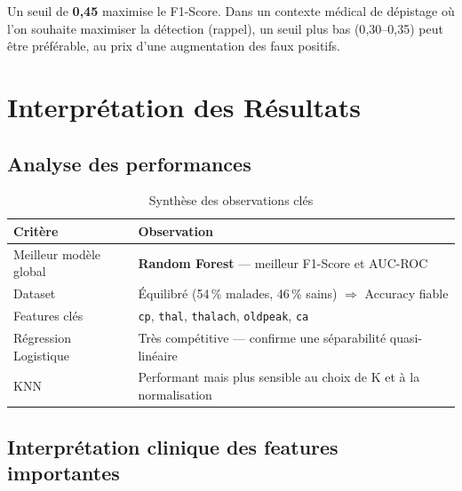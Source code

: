\documentclass[12pt,a4paper]{article}
\newcommand{\feat}[1]{\texttt{\textcolor{medblue}{#1}}}
\newcommand{\model}[1]{\textbf{\textcolor{medblue}{#1}}}
\begin{document}
            Un seuil de \textbf{0{,}45} maximise le F1-Score. Dans un contexte médical de dépistage où l'on souhaite maximiser la détection (rappel), un seuil plus bas (0{,}30–0{,}35) peut être préférable, au prix d'une augmentation des faux positifs.

    \section{Interprétation des Résultats}

        \subsection{Analyse des performances}
        
            \begin{table}[H]
              \centering
              \caption{Synthèse des observations clés}
              \begin{tabularx}{\textwidth}{lX}
                \toprule
                \textbf{Critère} & \textbf{Observation} \\
                \midrule
                Meilleur modèle global & \model{Random Forest} — meilleur F1-Score et AUC-ROC \\
                Dataset & Équilibré (54\,\% malades, 46\,\% sains) $\Rightarrow$ Accuracy fiable \\
                Features clés & \feat{cp}, \feat{thal}, \feat{thalach}, \feat{oldpeak}, \feat{ca}  \\
                Régression Logistique & Très compétitive — confirme une séparabilité quasi-linéaire \\
                KNN & Performant mais plus sensible au choix de K et à la normalisation \\
                \bottomrule
              \end{tabularx}
            \end{table}
            
		\subsection{Interprétation clinique des features importantes}
		
\end{document}
